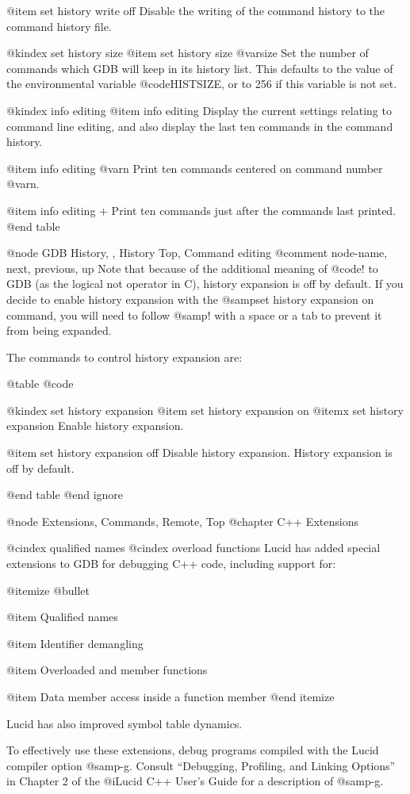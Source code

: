@item set history write off
Disable the writing of the command history to the command history file. 

@kindex set history size
@item set history size @var{size}
Set the number of commands which GDB will keep in its history list.
This defaults to the value of the environmental variable
@code{HISTSIZE}, or to 256 if this variable is not set.

@kindex info editing
@item info editing
Display the current settings relating to command line editing, and also
display the last ten commands in the command history.

@item info editing @var{n}
Print ten commands centered on command number @var{n}.

@item info editing +
Print ten commands just after the commands last printed.
@end table

@node GDB History, , History Top, Command editing    
@comment  node-name,  next,  previous,  up
Note that because of the additional meaning of @code{!} to GDB (as the
logical not operator in C), history expansion is off by default.  If you
decide to enable history expansion with the @samp{set history expansion
on} command, you will need to follow @samp{!} with a space or a tab to
prevent it from being expanded.

The commands to control history expansion are:

@table @code

@kindex set history expansion
@item set history expansion on
@itemx set history expansion
Enable history expansion.

@item set history expansion off
Disable history expansion.  History expansion is off by default.

@end table
@end ignore

@node Extensions, Commands, Remote, Top
@chapter C++ Extensions

@cindex qualified names 
@cindex overload functions 
Lucid has added special extensions to GDB for debugging C++ code,
including support for:

@itemize @bullet 

@item 
Qualified names

@item 
Identifier demangling

@item
Overloaded and member functions

@item
Data member access inside a function member
@end itemize

Lucid has also improved symbol table dynamics.  

To effectively use these extensions, debug programs compiled with the
Lucid compiler option @samp{-g}. Consult ``Debugging, Profiling, and
Linking Options'' in Chapter 2 of the @i{Lucid C++ User's Guide} for a
description of @samp{-g}.

